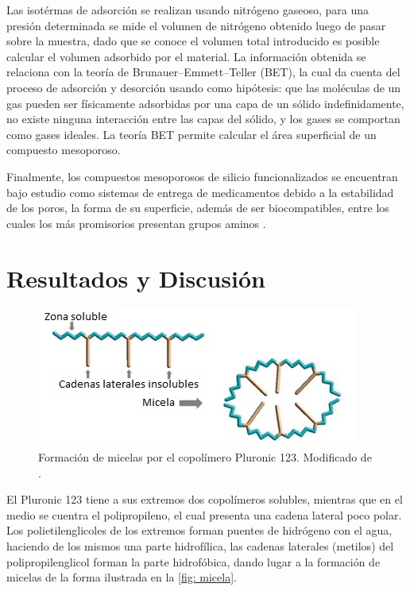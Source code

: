 \documentclass[fleqn, 12pt]{SelfArx}
\begin{document}
Las isot\'ermas de adsorci\'on se realizan usando nitr\'ogeno gaseoso, para una presi\'on determinada se mide el volumen de nitr\'ogeno obtenido luego de pasar sobre la muestra, dado que se conoce el volumen total introducido es posible calcular el volumen adsorbido por el material. La informaci\'on obtenida se relaciona con la teor\'ia de Brunauer–Emmett–Teller (BET), la cual da cuenta del proceso de adsorci\'on y desorci\'on usando como hip\'otesis: que las mol\'eculas de un gas pueden ser f\'isicamente adsorbidas por una capa de un s\'olido indefinidamente, no existe ninguna interacci\'on entre las capas del s\'olido, y los gases se comportan como gases ideales. La teor\'ia BET permite calcular el \'area superficial de un compuesto mesoporoso.

Finalmente, los compuestos mesoporosos de silicio funcionalizados se encuentran bajo estudio como sistemas de entrega de medicamentos debido a la estabilidad de los poros, la forma de su superficie, adem\'as de ser biocompatibles, entre los cuales los m\'as promisorios presentan grupos aminos \cite{vargas_legnoverde_giraldo_basaldella_moreno-pirajan_2010}.

\section{Resultados y Discusi\'on}
\begin{figure}[h]
	\centering
	\includegraphics[width=0.8\linewidth]{structures/Micela.jpg}
	\caption{Formaci\'on de micelas por el copol\'imero Pluronic 123. Modificado de \cite{grallert_rangel_yagui_pasqualoto_tavares_2012}.}
	\label{fig: micela}
\end{figure}
El Pluronic 123 tiene a sus extremos dos copol\'imeros solubles, mientras que en el medio se cuentra el polipropileno, el cual presenta una cadena lateral poco polar. Los polietilenglicoles de los extremos forman puentes de hidr\'ogeno con el agua, haciendo de los mismos una parte hidrof\'ilica, las cadenas laterales (metilos) del polipropilenglicol forman la parte hidrof\'obica, dando lugar a la formaci\'on de micelas de la forma ilustrada en la \autoref{fig: micela}.
\end{document}
